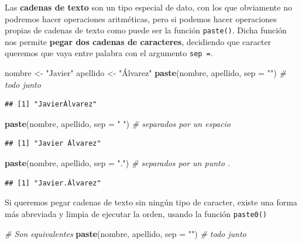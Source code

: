 \documentclass[11pt,]{book}
\newenvironment{Shaded}{\begin{snugshade}}{\end{snugshade}}
\newcommand{\CommentTok}[1]{\textcolor[rgb]{0.37,0.37,0.37}{\textit{#1}}}
\newcommand{\DataTypeTok}[1]{\textcolor[rgb]{0.27,0.27,0.27}{#1}}
\newcommand{\KeywordTok}[1]{\textcolor[rgb]{0.27,0.27,0.27}{\textbf{#1}}}
\newcommand{\NormalTok}[1]{#1}
\newcommand{\StringTok}[1]{\textcolor[rgb]{0.5,0.5,0.5}{#1}}
\begin{document}
Las \textbf{cadenas de texto} son un tipo especial de dato, con los que obviamente no podremos hacer operaciones aritméticas, pero si podemos hacer operaciones propias de cadenas de texto como puede ser la función \texttt{paste()}. Dicha función nos permite \textbf{pegar dos cadenas de caracteres}, decidiendo que caracter queremos que vaya entre palabra con el argumento \texttt{sep\ =}.

\begin{Shaded}
\begin{Highlighting}[]
\NormalTok{nombre <-}\StringTok{ "Javier"}
\NormalTok{apellido <-}\StringTok{ "Álvarez"}
\KeywordTok{paste}\NormalTok{(nombre, apellido, }\DataTypeTok{sep =} \StringTok{""}\NormalTok{) }\CommentTok{# todo junto}
\end{Highlighting}
\end{Shaded}

\begin{verbatim}
## [1] "JavierÁlvarez"
\end{verbatim}

\begin{Shaded}
\begin{Highlighting}[]
\KeywordTok{paste}\NormalTok{(nombre, apellido, }\DataTypeTok{sep =} \StringTok{" "}\NormalTok{) }\CommentTok{# separados por un espacio}
\end{Highlighting}
\end{Shaded}

\begin{verbatim}
## [1] "Javier Álvarez"
\end{verbatim}

\begin{Shaded}
\begin{Highlighting}[]
\KeywordTok{paste}\NormalTok{(nombre, apellido, }\DataTypeTok{sep =} \StringTok{"."}\NormalTok{) }\CommentTok{# separados por un punto .}
\end{Highlighting}
\end{Shaded}

\begin{verbatim}
## [1] "Javier.Álvarez"
\end{verbatim}

Si queremos pegar cadenas de texto sin ningún tipo de caracter, existe una forma más abreviada y limpia de ejecutar la orden, usando la función \texttt{paste0()}

\begin{Shaded}
\begin{Highlighting}[]
\CommentTok{# Son equivalentes}
\KeywordTok{paste}\NormalTok{(nombre, apellido, }\DataTypeTok{sep =} \StringTok{""}\NormalTok{) }\CommentTok{# todo junto}
\end{Highlighting}
\end{Shaded}
\end{document}
